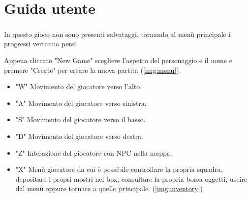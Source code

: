 \appendix
\chapter{Guida utente}

\paragraph{}{
In questo gioco non sono presenti salvataggi, tornando al menù principale i progressi verranno persi.

Appena cliccato "New Game" scegliere l'aspetto del personaggio e il nome e premere "Create" per creare la nuova partita (\cref{img:menu}).
}

\begin{itemize}
    \item{"W"} Movimento del giocatore verso l'alto.
    \item{"A"} Movimento del giocatore verso sinistra.
    \item{"S"} Movimento del giocatore verso il basso.
    \item{"D"} Movimento del giocatore verso destra.
    \item{"Z"} Interazione del giocatore con NPC nella mappa.
    \item{"X"} Menù giocatore da cui è possibile controllare la propria squadra, depositare i propri mostri nel box, consultare la propria borsa oggetti, uscire dal menù oppure tornare a quello principale. (\cref{img:inventory})
\end{itemize}

